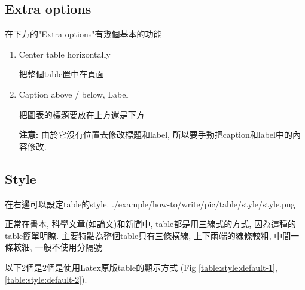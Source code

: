 \newpage
\subsection{Extra options}

  在下方的"Extra options"有幾個基本的功能

\begin{enumerate}

  \item
  {
    Center table horizontally

    把整個table置中在頁面

  } %

  \newpage
  \item
  {
    Caption above / below, Label

    把圖表的標題要放在上方還是下方



    {\bf 注意:} 由於它沒有位置去修改標題和label, 所以要手動把caption和label中的內容修改.
  } %
\end{enumerate}


\newpage
\subsection{Style}

  在右邊可以設定table的style.
  \InsertCenterImage
    {./example/how-to/write/pic/table/style/style.png}

   正常在書本, 科學文章(如論文)和新聞中, table都是用三線式的方式, 因為這種的table簡單明瞭. 主要特點為整個table只有三條橫線, 上下兩端的線條較粗, 中間一條較細, 一般不使用分隔號.

  以下2個是2個是使用Latex原版table的顯示方式 (Fig \ref{table:style:default-1}, \ref{table:style:default-2}).


